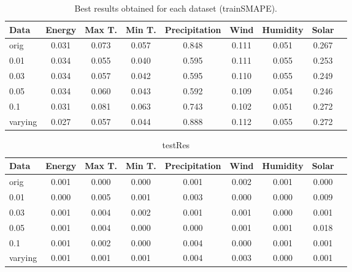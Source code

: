 \documentclass[12pt]{article}
\begin{document}
\begin{table}
\begin{tabular}{|p{2cm}|c|c|c|c|c|c|c|c|}
\hline
Data &Energy & Max T. & Min T. & Precipitation & Wind & Humidity & Solar\\
\hline
\multirow{1}{*}{orig} &   0.031 &    0.073 &    0.057 &    0.848 &    0.111 &    0.051 &    0.267\\
\cline{1-7}
\hline
\multirow{1}{*}{0.01} &   0.034 &    0.055 &    0.040 &    0.595 &    0.111 &    0.055 &    0.253\\
\cline{1-7}
\hline
\multirow{1}{*}{0.03} &   0.034 &    0.057 &    0.042 &    0.595 &    0.110 &    0.055 &    0.249\\
\cline{1-7}
\hline
\multirow{1}{*}{0.05} &   0.034 &    0.060 &    0.043 &    0.592 &    0.109 &    0.054 &    0.246\\
\cline{1-7}
\hline
\multirow{1}{*}{0.1} &   0.031 &    0.081 &    0.063 &    0.743 &    0.102 &    0.051 &    0.272\\
\cline{1-7}
\hline
\multirow{1}{*}{varying} &   0.027 &    0.057 &    0.044 &    0.888 &    0.112 &    0.055 &    0.272\\
\cline{1-7}
\hline
\end{tabular}\caption{Best results obtained for each dataset (trainSMAPE).}
\end{table}

\begin{table}
\begin{tabular}{|p{2cm}|c|c|c|c|c|c|c|c|}
\hline
Data &Energy & Max T. & Min T. & Precipitation & Wind & Humidity & Solar\\
\hline
\multirow{1}{*}{orig} &   0.001 &    0.000 &    0.000 &    0.001 &    0.002 &    0.001 &    0.000\\
\cline{1-7}
\hline
\multirow{1}{*}{0.01} &   0.000 &    0.005 &    0.001 &    0.003 &    0.000 &    0.000 &    0.009\\
\cline{1-7}
\hline
\multirow{1}{*}{0.03} &   0.001 &    0.004 &    0.002 &    0.001 &    0.001 &    0.000 &    0.001\\
\cline{1-7}
\hline
\multirow{1}{*}{0.05} &   0.001 &    0.004 &    0.000 &    0.000 &    0.001 &    0.001 &    0.018\\
\cline{1-7}
\hline
\multirow{1}{*}{0.1} &   0.001 &    0.002 &    0.000 &    0.004 &    0.000 &    0.001 &    0.001\\
\cline{1-7}
\hline
\multirow{1}{*}{varying} &   0.001 &    0.001 &    0.001 &    0.004 &    0.003 &    0.000 &    0.001\\
\cline{1-7}
\hline
\end{tabular}\caption{testRes}
\end{table}
\end{document}
